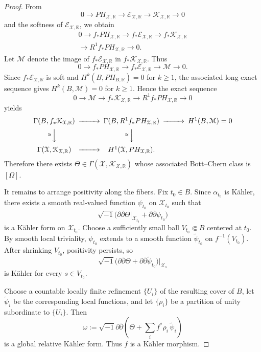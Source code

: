 \documentclass[11pt,letterpaper]{amsart}
\numberwithin{equation}{section}
\newcommand{\RR}{\mathbb{R}}
\newcommand{\cal}{\mathcal}
\def\cE{{\cal E}}
\def\cX{{\cal X}}
\def\dbar{\overline{\partial}}
\def\beq{\begin{equation}}
\def\eeq{\end{equation}}
\begin{document}
\begin{proof}
From
\[
0\longrightarrow PH_{\cX,\RR}\longrightarrow\cE_{\cX,\RR}
\longrightarrow\mathcal K_{\cX,\RR}\longrightarrow0
\]
and the softness of $\cE_{\cX,\RR}$, we obtain
\begin{multline}\label{sequence-3}
0\longrightarrow f_*PH_{\cX,\RR}\longrightarrow f_*\cE_{\cX,\RR}
\longrightarrow f_*\mathcal K_{\cX,\RR}\\
\longrightarrow R^1f_*PH_{\cX,\RR}\longrightarrow0.
\end{multline}
Let $\mathcal M$ denote the image of $f_*\cE_{\cX,\RR}$ in $f_*\mathcal K_{\cX,\RR}$. Thus
\[
0\longrightarrow f_*PH_{\cX,\RR}\longrightarrow f_*\cE_{\cX,\RR}
\longrightarrow\mathcal M\longrightarrow0.
\]
Since $f_*\cE_{\cX,\RR}$ is soft and $H^k(B,PH_{B,\RR})=0$ for $k\ge1$, the associated long exact sequence gives $H^k(B,\mathcal M)=0$ for $k\ge1$. Hence the exact sequence
\[
0\longrightarrow\mathcal M\longrightarrow f_*\mathcal K_{\cX,\RR}
\longrightarrow R^1f_*PH_{\cX,\RR}\longrightarrow0
\]
yields
\beq\label{sequence-4}
\begin{CD}
\Gamma(B,f_*\mathcal K_{\cX,\RR})@>>>
\Gamma(B,R^1f_*PH_{\cX,\RR})@>>>H^1(B,\mathcal M)=0\\
@V^{\cong}VV@V^{\cong}VV\\
\Gamma(\cX,\mathcal K_{\cX,\RR})@>>>H^1(\cX,PH_{\cX,\RR}).
\end{CD}
\eeq
Therefore there exists $\Theta\in\Gamma(\cX,\mathcal K_{\cX,\RR})$ whose associated Bott--Chern class is $[\Omega]$.

It remains to arrange positivity along the fibers. Fix $t_0\in B$. Since $\alpha_{t_0}$ is K\"ahler, there exists a smooth real-valued function $\psi_{t_0}$ on $\cX_{t_0}$ such that
\[
 \sqrt{-1}\bigl(\partial\dbar\Theta|_{\cX_{t_0}}
 +\partial\dbar\psi_{t_0}\bigr)
\]
is a K\"ahler form on $\cX_{t_0}$. Choose a sufficiently small ball $V_{t_0}\Subset B$ centered at $t_0$. By smooth local triviality, $\psi_{t_0}$ extends to a smooth function $\widetilde\psi_{t_0}$ on $f^{-1}(V_{t_0})$. After shrinking $V_{t_0}$, positivity persists, so
\[
 \sqrt{-1}\bigl(\partial\dbar\Theta+
 \partial\dbar\widetilde\psi_{t_0}\bigr)|_{\cX_s}
\]
is K\"ahler for every $s\in V_{t_0}$.

Choose a countable locally finite refinement $\{U_i\}$ of the resulting cover of $B$, let $\widetilde\psi_i$ be the corresponding local functions, and let $\{\rho_i\}$ be a partition of unity subordinate to $\{U_i\}$. Then
\[
 \omega:=\sqrt{-1}\partial\dbar
 \left(\Theta+\sum_i f^*\rho_i\,\widetilde\psi_i\right)
\]
is a global relative K\"ahler form. Thus $f$ is a K\"ahler morphism.
\end{proof}
\end{document}
